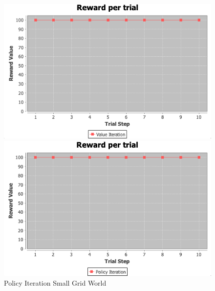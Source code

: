 \documentclass[11pt]{article}
\newcommand{\problemone}{Small Grid World}
\newcommand{\problemtwo}{Mountain Car}
\begin{document}
    \begin{figure}
        \begin{minipage}{0.5\textwidth}
            \centering
            \includegraphics[width=1\linewidth]{valueiterproblem2.png}
            \caption{Value Iteration \problemtwo}\label{Fig:Value Iteration \problemtwo}
        \end{minipage}
        \begin{minipage}{0.5\textwidth}
            \centering
            \includegraphics[width=1\linewidth]{policyiterproblem2.png}
            \caption{Policy Iteration \problemone}\label{Fig:Policy Iteration \problemtwo}
        \end{minipage}
    \end{figure}
\end{document}
